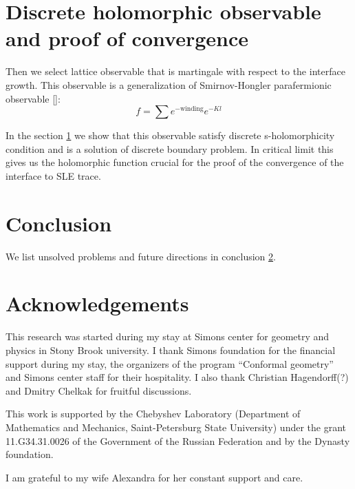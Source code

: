 \documentclass[12pt]{article}
\begin{document}
\section{Discrete holomorphic observable and proof of convergence}
\label{sec:discr-holom-observ}

 Then we
select lattice observable that is martingale with respect to the interface growth.
This observable is a generalization of Smirnov-Hongler parafermionic observable []:
\begin{equation}
  \label{eq:3}
  f = \sum e^{-\mbox{winding}} e^{-Kl}
\end{equation}

In the section \ref{sec:discr-holom-observ} we show that this observable satisfy discrete s-holomorphicity
condition and is a solution of discrete boundary problem. In critical limit this gives us the
holomorphic function crucial for the proof of the convergence of the interface to SLE trace.

\section{Conclusion}
\label{sec:conclusion}

We list unsolved problems and future directions in conclusion \ref{sec:conclusion}.


\section*{Acknowledgements}
\label{sec:acknowledgements}

This research was started during my stay at Simons center for geometry and physics in Stony Brook
university. I thank Simons foundation for the financial support during my stay, the organizers of
the program ``Conformal geometry'' and Simons center staff for their hospitality. I also thank
Christian Hagendorff(?) and Dmitry Chelkak for fruitful discussions. 

This work  is supported by
the Chebyshev Laboratory (Department of Mathematics and Mechanics,
Saint-Petersburg State University) under the grant 11.G34.31.0026
of the Government of the Russian Federation and by the Dynasty foundation. 

I am grateful to my wife Alexandra for her constant support and care. 

{} 

\end{document}
